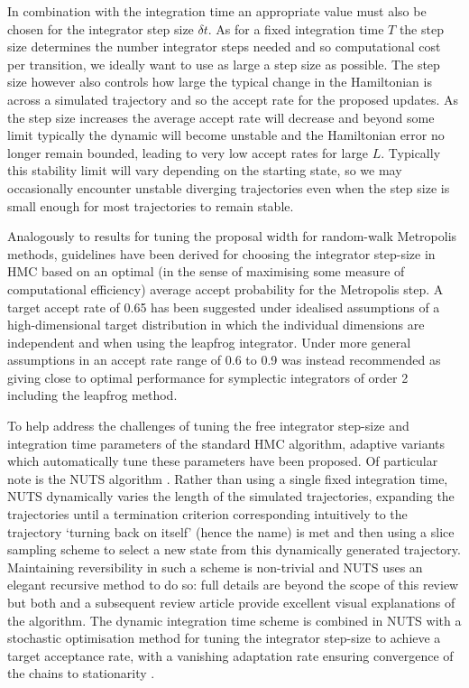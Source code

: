 In combination with the integration time an appropriate value must also be chosen for the integrator step size $\delta t$. As for a fixed integration time $T$ the step size determines the number integrator steps needed and so computational cost per transition, we ideally want to use as large a step size as possible. The step size however also controls how large the typical change in the Hamiltonian is across a simulated trajectory and so the accept rate for the proposed updates. As the step size increases the average accept rate will decrease and beyond some limit typically the dynamic will become unstable and the Hamiltonian error no longer remain bounded, leading to very low accept rates for large $L$. Typically this stability limit will vary depending on the starting state, so we may occasionally encounter unstable diverging trajectories even when the step size is small enough for most trajectories to remain stable. 

Analogously to results for tuning the proposal width for random-walk Metropolis methods, guidelines have been derived for choosing the integrator step-size in \ac{HMC} based on an optimal (in the sense of maximising some measure of computational efficiency) average accept probability for the Metropolis step. A target accept rate of 0.65 has been suggested \citep{neal2011mcmc,beskos2013optimal} under idealised assumptions of a high-dimensional target distribution in which the individual dimensions are independent and when using the leapfrog integrator. Under more general assumptions in \citep{betancourt2014optimizing} an accept rate range of 0.6 to 0.9 was instead recommended as giving close to optimal performance for symplectic integrators of order 2 including the leapfrog method.

To help address the challenges of tuning the free integrator step-size and integration time parameters of the standard \ac{HMC} algorithm, adaptive variants which automatically tune these parameters have been proposed. Of particular note is the \ac{NUTS} algorithm \citep{hoffman2014no}. Rather than using a single fixed integration time, \ac{NUTS} dynamically varies the length of the simulated trajectories, expanding the trajectories until a termination criterion corresponding intuitively to the trajectory `turning back on itself' (hence the name) is met and then using a slice sampling scheme to select a new state from this dynamically generated trajectory. Maintaining reversibility in such a scheme is non-trivial and \ac{NUTS} uses an elegant recursive method to do so: full details are beyond the scope of this review but both \citep{hoffman2014no} and a subsequent review article \citep{betancourt2017conceptual} provide excellent visual explanations of the algorithm. The dynamic integration time scheme is combined in \ac{NUTS} with a stochastic optimisation method for tuning the integrator step-size to achieve a target acceptance rate, with a vanishing adaptation rate ensuring convergence of the chains to stationarity \citep{andrieu2008tutorial}.

